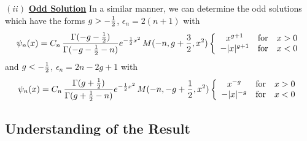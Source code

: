 \documentclass[a4paper,11pt]{article}
\begin{document}
\noindent $(ii)$ {\bf\underline{Odd Solution}}
In a similar manner, we can determine the odd solutions which have the
forms 
$g>-{1\over 2}$, $\epsilon_{n} = 2(n+1)$
with
\begin{equation}
\psi_{n}(x) = C_{n}\,\frac{\Gamma(-g-{1\over 2})}{\Gamma(-g-{1\over
2}-n)}e^{-{1\over 2}x^{2}}\,M(-n,g+{3\over
2},x^{2})\left\{\begin{array}{cll}
                x^{g+1}& {\rm for} & x>0\\
                -|x|^{g+1}& {\rm for} & x<0
               \end{array}\right.\label{c24}
\end{equation}
and
$g<-{1\over 2}$, $\epsilon_{n} = 2n -2g + 1$
with
\begin{equation}
\psi_{n}(x) = C_{n}\,\frac{\Gamma(g+{1\over 2})}{\Gamma(g+{1\over
2}-n)}e^{-{1\over 2}x^{2}}\,M(-n,-g+{1\over
2},x^{2})\left\{\begin{array}{cll}
                x^{-g}& {\rm for} & x>0\\
                -|x|^{-g}& {\rm for} & x<0
               \end{array}\right.\label{c26}
\end{equation}

\subsection*{Understanding  of the Result}
\end{document}
